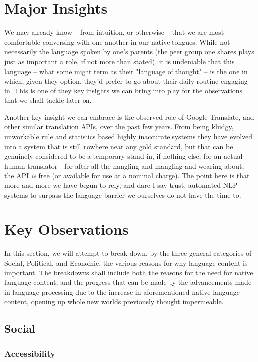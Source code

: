 \documentclass[11pt]{article}
\begin{document}
\section{Major Insights}

We may already know -- from intuition, or otherwise -- that we are most
comfortable conversing with one another in our native tongues. While not
necessarily the language spoken by one's parents (the peer group one shares
plays just as important a role, if not more than stated), it is undeniable that
this language -- what some might term as their "language of thought" -- is the
one in which, given they option, they'd prefer to go about their daily routine
engaging in. This is one of they key insights we can bring into play for the
observations that we shall tackle later on.

Another key insight we can embrace is the observed role of Google Translate, and
other similar translation APIs, over the past few years. From being kludgy,
unworkable rule and statistics based highly inaccurate systems they have evolved
into a system that is still nowhere near any gold standard, but that can be
genuinely considered to be a temporary stand-in, if nothing else, for an actual
human translator - for after all the hangling and mangling and wearing about,
the API \textit{is} free (or available for use at a nominal charge). The point
here is that more and more we have begun to rely, and dare I say trust,
automated NLP systems to surpass the language barrier we ourselves do not have
the time to.

\section{Key Observations}

In this section, we will attempt to break down, by the three general categories
of Social, Political, and Economic, the various reasons for why language content
is important. The breakdowns shall include both the reasons for the need for 
native language content, and the progress that can be made by the advancements
made in language processing due to the increase in aforementioned native
language content, opening up whole new worlds previously thought impermeable.

\subsection{Social}

\subsubsection{Accessibility}
\end{document}
